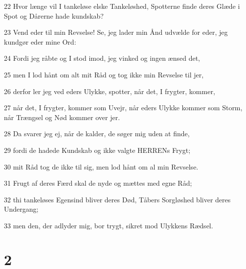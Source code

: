 \par 22 Hvor længe vil I tankeløse elske Tankeløshed, Spotterne finde deres Glæde i Spot og Dårerne hade kundskab?
\par 23 Vend eder til min Revselse! Se, jeg lader min Ånd udvælde for eder, jeg kundgør eder mine Ord:
\par 24 Fordi jeg råbte og I stod imod, jeg vinked og ingen ænsed det,
\par 25 men I lod hånt om alt mit Råd og tog ikke min Revselse til jer,
\par 26 derfor ler jeg ved eders Ulykke, spotter, når det, I frygter, kommer,
\par 27 når det, I frygter, kommer som Uvejr, når eders Ulykke kommer som Storm, når Trængsel og Nød kommer over jer.
\par 28 Da svarer jeg ej, når de kalder, de søger mig uden at finde,
\par 29 fordi de hadede Kundskab og ikke valgte HERRENs Frygt;
\par 30 mit Råd tog de ikke til sig, men lod hånt om al min Revselse.
\par 31 Frugt af deres Færd skal de nyde og mættes med egne Råd;
\par 32 thi tankeløses Egensind bliver deres Død, Tåbers Sorgløshed bliver deres Undergang;
\par 33 men den, der adlyder mig, bor trygt, sikret mod Ulykkens Rædsel.

\chapter{2}

